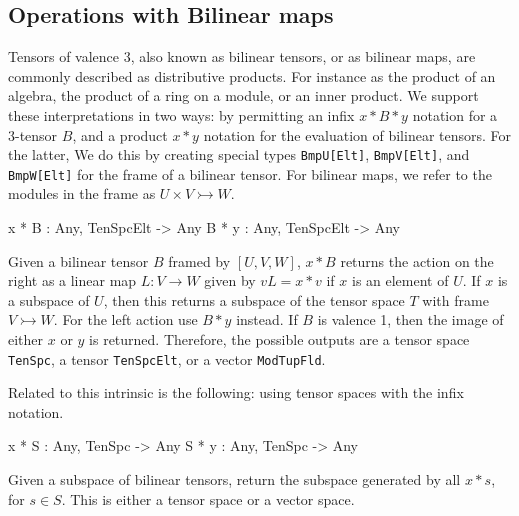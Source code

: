 \subsection{Operations with Bilinear maps}
Tensors of valence $3$, also known as bilinear tensors, or
as bilinear maps,  are commonly described as distributive products.
For instance as the product of an algebra, the product of a ring on 
a module, or an inner product.  We support these interpretations in two ways:
by permitting an infix $x*B*y$ notation for a 3-tensor $B$, and a product $x*y$ notation for the evaluation of bilinear
tensors.  For the latter, We do this by creating special types 
{\tt BmpU[Elt]}, {\tt BmpV[Elt]}, and {\tt BmpW[Elt]} for the frame
of a bilinear tensor.
For bilinear maps, we refer to the modules in the frame as $U\times V\rightarrowtail W$. 

\begin{intrinsics}
x * B : Any, TenSpcElt -> Any
B * y : Any, TenSpcElt -> Any
\end{intrinsics}

Given a bilinear tensor $B$ framed by $[U, V, W]$, $x*B$ returns the action on the right as a linear map $L : V\rightarrow W$ given by $vL = x* v$ if $x$ is an element of $U$. 
If $x$ is a subspace of $U$, then this returns a subspace of the tensor space $T$ with frame $V\rightarrowtail W$.
For the left action use $B*y$ instead.
If $B$ is valence 1, then the image of either $x$ or $y$ is returned.
Therefore, the possible outputs are a tensor space {\tt TenSpc}, a tensor {\tt TenSpcElt}, or a vector {\tt ModTupFld}. 

Related to this intrinsic is the following: using tensor spaces with the infix notation.

\begin{intrinsics}
x * S : Any, TenSpc -> Any
S * y : Any, TenSpc -> Any
\end{intrinsics}

Given a subspace of bilinear tensors, return the subspace generated by all $x*s$, for $s\in S$. 
This is either a tensor space or a vector space. 

